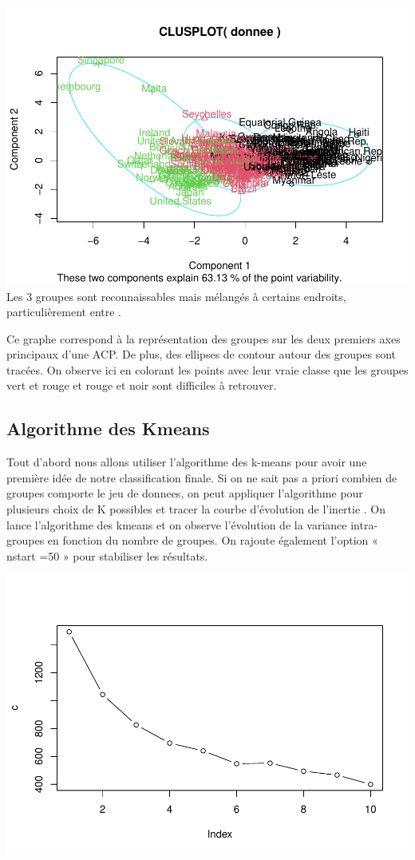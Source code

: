 \documentclass[
]{article}
\begin{document}
\includegraphics{Projet_files/figure-latex/unnamed-chunk-23-1.pdf} Les 3
groupes sont reconnaissables mais mélangés à certains endroits,
particulièrement entre .

Ce graphe correspond à la représentation des groupes sur les deux
premiers axes principaux d'une ACP. De plus, des ellipses de contour
autour des groupes sont tracées. On observe ici en colorant les points
avec leur vraie classe que les groupes vert et rouge et rouge et noir
sont difficiles à retrouver.

\hypertarget{algorithme-des-kmeans}{%
\subsection{Algorithme des Kmeans}\label{algorithme-des-kmeans}}

Tout d'abord nous allons utiliser l'algorithme des k-means pour avoir
une première idée de notre classification finale. Si on ne sait pas a
priori combien de groupes comporte le jeu de donnees, on peut appliquer
l'algorithme pour plusieurs choix de K possibles et tracer la courbe
d'évolution de l'inertie . On lance l'algorithme des kmeans et on
observe l'évolution de la variance intra-groupes en fonction du nombre
de groupes. On rajoute également l'option « nstart =50 » pour stabiliser
les résultats.

\includegraphics{Projet_files/figure-latex/unnamed-chunk-24-1.pdf}
\end{document}
